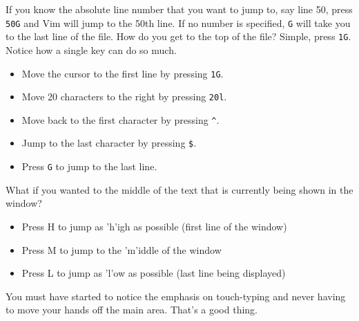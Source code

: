 If you know the absolute line number
that you want to jump to, say line 50, press \texttt{50G} and Vim will jump to
the 50th line. If no number is specified, \texttt{G} will take you to the last
line of the file. How do you get to the top of the file? Simple, press
\texttt{1G}. Notice how a single key can do so much. 
\begin{itemize}
\item Move the cursor to the first line by pressing \texttt{1G}. 
\item Move 20 characters to the right by pressing \texttt{20l}. 
\item Move back to the first character by pressing \texttt{\^}. 
\item Jump to the last character by pressing \texttt{\$}. 
\item Press \texttt{G} to jump to the last line. 
\end{itemize}
What if you wanted to the middle of the
text that is currently being shown in the window? 
\begin{itemize}
\item Press H to jump as 'h'igh as possible (first line of the window) 
\item Press M to jump to the 'm'iddle of the window 
\item Press L to jump as 'l'ow as possible (last line being displayed) 
\end{itemize}
You must have started to notice the emphasis on touch-typing and never having to
move your hands off the main area. That's a good thing. 

